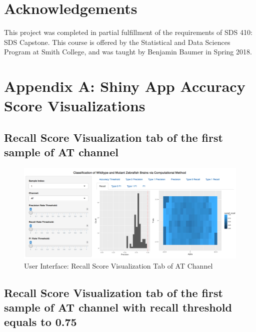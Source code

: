 \documentclass[10pt,letterpaper]{article}
\begin{document}
\section{Acknowledgements}\label{acknowledgements}

This project was completed in partial fulfillment of the requirements of
SDS 410: SDS Capstone. This course is offered by the Statistical and
Data Sciences Program at Smith College, and was taught by Benjamin
Baumer in Spring 2018.

\newpage

\section{Appendix A: Shiny App Accuracy Score
Visualizations}\label{appendix-a-shiny-app-accuracy-score-visualizations}

\subsection{Recall Score Visualization tab of the first sample of AT
channel}\label{recall-score-visualization-tab-of-the-first-sample-of-at-channel}

\begin{figure}[h]

{\centering \includegraphics[width=4.91in]{figures/shiny4} 

}

\caption{User Interface: Recall Score Visualization Tab of AT Channel}\label{fig:shiny4}
\end{figure}

\subsection{Recall Score Visualization tab of the first sample of AT
channel with recall threshold equals to
0.75}\label{recall-score-visualization-tab-of-the-first-sample-of-at-channel-with-recall-threshold-equals-to-0.75}
\end{document}

